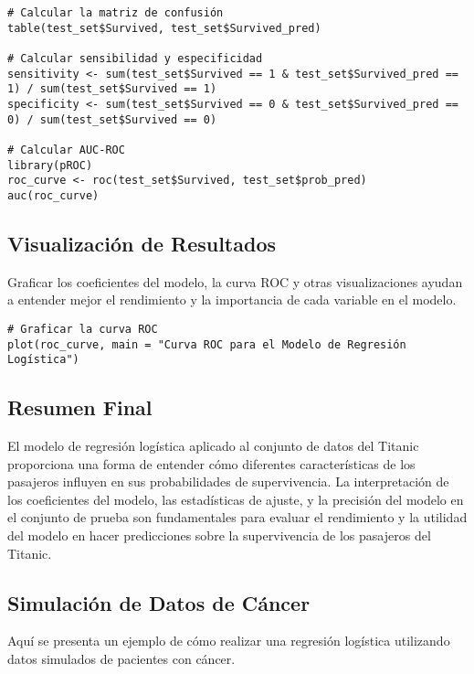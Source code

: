 \begin{verbatim}
# Calcular la matriz de confusión
table(test_set$Survived, test_set$Survived_pred)

# Calcular sensibilidad y especificidad
sensitivity <- sum(test_set$Survived == 1 & test_set$Survived_pred == 1) / sum(test_set$Survived == 1)
specificity <- sum(test_set$Survived == 0 & test_set$Survived_pred == 0) / sum(test_set$Survived == 0)

# Calcular AUC-ROC
library(pROC)
roc_curve <- roc(test_set$Survived, test_set$prob_pred)
auc(roc_curve)
\end{verbatim}

\subsection*{Visualización de Resultados}

Graficar los coeficientes del modelo, la curva ROC y otras visualizaciones ayudan a entender mejor el rendimiento y la importancia de cada variable en el modelo.

\begin{verbatim}
# Graficar la curva ROC
plot(roc_curve, main = "Curva ROC para el Modelo de Regresión Logística")
\end{verbatim}

\subsection*{Resumen Final}

El modelo de regresión logística aplicado al conjunto de datos del Titanic proporciona una forma de entender cómo diferentes características de los pasajeros influyen en sus probabilidades de supervivencia. La interpretación de los coeficientes del modelo, las estadísticas de ajuste, y la precisión del modelo en el conjunto de prueba son fundamentales para evaluar el rendimiento y la utilidad del modelo en hacer predicciones sobre la supervivencia de los pasajeros del Titanic.

\subsection{Simulaci\'on de Datos de Cáncer}

Aquí se presenta un ejemplo de cómo realizar una regresión logística utilizando datos simulados de pacientes con cáncer.

